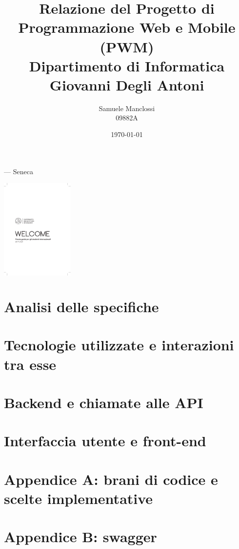 \documentclass{article}
\title{
    {\LARGE Relazione del Progetto di Programmazione Web e Mobile}\\
    (PWM)\\
    \vskip 0.4cm{\large Dipartimento di Informatica Giovanni Degli Antoni}
}
\author{
    \Large Samuele Manclossi\\
    \large 09882A
}
\date{
    {\large\today}
}
\begin{document}

\begin{titlepage}
    \pagestyle{empty}
    \maketitle
    \vspace{1em}
    \epigraph{}{--- \textup{Seneca}}
    \vspace{2em}
    \begin{abstract}
        \textit{}
    \end{abstract}
    \vskip 4cm\centerline{\includegraphics[height=50mm]{./src/unimi}}
    \newpage
    \tableofcontents
    \vspace{\fill}
\end{titlepage}


\section{Analisi delle specifiche}

\section{Tecnologie utilizzate e interazioni tra esse}

\section{Backend e chiamate alle API}

\section{Interfaccia utente e front-end}

\section{Appendice A: brani di codice e scelte implementative}

\section{Appendice B: swagger}
\end{document}
